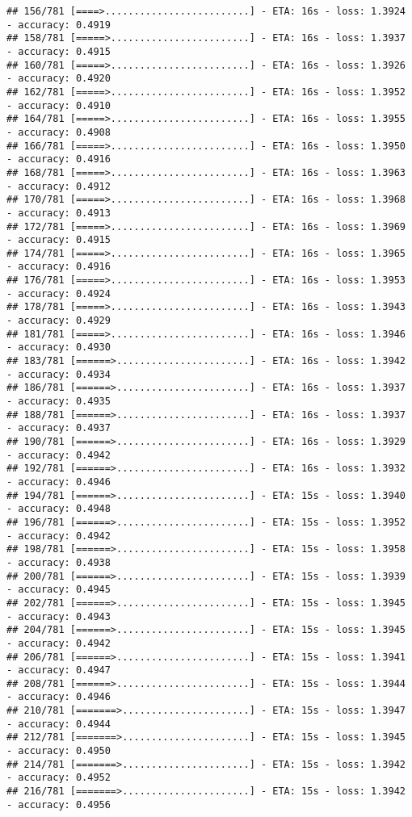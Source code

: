 \documentclass[
]{article}
\begin{document}
\begin{verbatim}
## 156/781 [====>.........................] - ETA: 16s - loss: 1.3924 - accuracy: 0.4919
## 158/781 [=====>........................] - ETA: 16s - loss: 1.3937 - accuracy: 0.4915
## 160/781 [=====>........................] - ETA: 16s - loss: 1.3926 - accuracy: 0.4920
## 162/781 [=====>........................] - ETA: 16s - loss: 1.3952 - accuracy: 0.4910
## 164/781 [=====>........................] - ETA: 16s - loss: 1.3955 - accuracy: 0.4908
## 166/781 [=====>........................] - ETA: 16s - loss: 1.3950 - accuracy: 0.4916
## 168/781 [=====>........................] - ETA: 16s - loss: 1.3963 - accuracy: 0.4912
## 170/781 [=====>........................] - ETA: 16s - loss: 1.3968 - accuracy: 0.4913
## 172/781 [=====>........................] - ETA: 16s - loss: 1.3969 - accuracy: 0.4915
## 174/781 [=====>........................] - ETA: 16s - loss: 1.3965 - accuracy: 0.4916
## 176/781 [=====>........................] - ETA: 16s - loss: 1.3953 - accuracy: 0.4924
## 178/781 [=====>........................] - ETA: 16s - loss: 1.3943 - accuracy: 0.4929
## 181/781 [=====>........................] - ETA: 16s - loss: 1.3946 - accuracy: 0.4930
## 183/781 [======>.......................] - ETA: 16s - loss: 1.3942 - accuracy: 0.4934
## 186/781 [======>.......................] - ETA: 16s - loss: 1.3937 - accuracy: 0.4935
## 188/781 [======>.......................] - ETA: 16s - loss: 1.3937 - accuracy: 0.4937
## 190/781 [======>.......................] - ETA: 16s - loss: 1.3929 - accuracy: 0.4942
## 192/781 [======>.......................] - ETA: 16s - loss: 1.3932 - accuracy: 0.4946
## 194/781 [======>.......................] - ETA: 15s - loss: 1.3940 - accuracy: 0.4948
## 196/781 [======>.......................] - ETA: 15s - loss: 1.3952 - accuracy: 0.4942
## 198/781 [======>.......................] - ETA: 15s - loss: 1.3958 - accuracy: 0.4938
## 200/781 [======>.......................] - ETA: 15s - loss: 1.3939 - accuracy: 0.4945
## 202/781 [======>.......................] - ETA: 15s - loss: 1.3945 - accuracy: 0.4943
## 204/781 [======>.......................] - ETA: 15s - loss: 1.3945 - accuracy: 0.4942
## 206/781 [======>.......................] - ETA: 15s - loss: 1.3941 - accuracy: 0.4947
## 208/781 [======>.......................] - ETA: 15s - loss: 1.3944 - accuracy: 0.4946
## 210/781 [=======>......................] - ETA: 15s - loss: 1.3947 - accuracy: 0.4944
## 212/781 [=======>......................] - ETA: 15s - loss: 1.3945 - accuracy: 0.4950
## 214/781 [=======>......................] - ETA: 15s - loss: 1.3942 - accuracy: 0.4952
## 216/781 [=======>......................] - ETA: 15s - loss: 1.3942 - accuracy: 0.4956

\end{verbatim}
\end{document}

